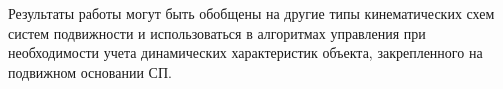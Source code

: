 Результаты работы могут быть обобщены на другие типы кинематических схем систем подвижности и использоваться в алгоритмах управления при необходимости учета динамических характеристик объекта, закрепленного на подвижном основании СП.

\newpage
{} %
